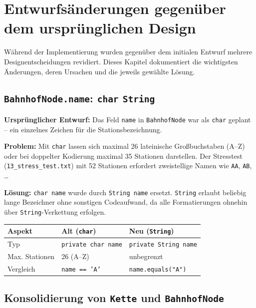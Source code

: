\documentclass[12pt,a4paper]{article}
\begin{document}
\section{Entwurfsänderungen gegenüber dem ursprünglichen Design}

Während der Implementierung wurden gegenüber dem initialen Entwurf mehrere
Designentscheidungen revidiert. Dieses Kapitel dokumentiert die wichtigsten
Änderungen, deren Ursachen und die jeweils gewählte Lösung.

\subsection{\texttt{BahnhofNode.name}: \texttt{char} \textrightarrow{} \texttt{String}}

\textbf{Ursprünglicher Entwurf:} Das Feld \texttt{name} in \texttt{BahnhofNode} war als
\texttt{char} geplant – ein einzelnes Zeichen für die Stationsbezeichnung.

\textbf{Problem:} Mit \texttt{char} lassen sich maximal 26 lateinische Großbuchstaben
(A–Z) oder bei doppelter Kodierung maximal 35 Stationen darstellen. Der
Stresstest (\texttt{13\_stress\_test.txt}) mit 52 Stationen erfordert
zweistellige Namen wie \texttt{AA}, \texttt{AB}, \ldots

\textbf{Lösung:} \texttt{char name} wurde durch \texttt{String name} ersetzt.
\texttt{String} erlaubt beliebig lange Bezeichner ohne sonstigen Codeaufwand, da
alle Formatierungen ohnehin über \texttt{String}-Verkettung erfolgen.

\begin{center}
\begin{tabular}{lll}
\toprule
\textbf{Aspekt} & \textbf{Alt (\texttt{char})} & \textbf{Neu (\texttt{String})} \\
\midrule
Typ             & \texttt{private char name}   & \texttt{private String name}   \\
Max. Stationen  & 26 (A–Z)                     & unbegrenzt                     \\
Vergleich       & \texttt{name == 'A'}         & \texttt{name.equals("A")}      \\
\bottomrule
\end{tabular}
\end{center}

\subsection{Konsolidierung von \texttt{Kette} und \texttt{BahnhofNode}}
\end{document}
